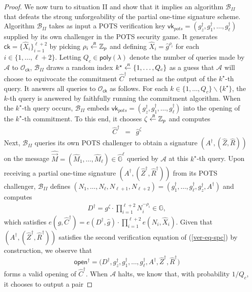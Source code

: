 \documentclass[10pt]{llncs}
\newcommand{\A}{\mathcal{A}}
\newcommand{\B}{\mathcal{B}}
\newcommand{\G}{\mathbb{G}}
\newcommand{\Z}{\mathbb{Z}}
\newcommand{\ck}{\mathsf{ck}}
\newcommand{\vk}{\mathsf{vk}}
\newcommand{\open}{\mathsf{open}}
\newcommand{\sample}{\stackrel{{\scriptscriptstyle \mkern4mu R}}{\gets}}
\begin{document}
\begin{proof}
We now turn to situation II and show that it implies an algorithm $\B_{II}$ that defeats  the strong unforgeability of the partial one-time signature scheme. Algorithm $\B_{II}$ takes as input a POTS verification key $\vk_{pots}=(g_z^\dagger,g_1^\dagger,\ldots,g_{\ell}^\dagger)$ supplied by its own challenger 
in the POTS security game. It generates $\ck = \{ \hat{X}_i \}_{i=1}^{\ell+2}$ by picking $\rho_i \sample \Z_p$ and 
defining $\hat{X}_i=\hat{g}^{\rho_i}$  for each $i \in \{1,\ldots, \ell+2\}$. Letting $Q_c \in \mathsf{poly}(\lambda)$ denote the number of 
queries made by $\A$ to $\mathcal{O}_{\ck}$, $\B_{II}$ draws a random 
index $k^\star \sample \{1,\ldots, Q_c \}$ as a guess that $\A$ will choose to equivocate the commitment $\hat{C}^\dagger$ returned as the 
output of the $k^\star$-th query. It answers all queries to $\mathcal{O}_\ck$ as follows. For each $k \in \{1,\ldots ,Q_c \} \backslash 
\{k^\star \}$, the $k$-th query is answered by faithfully running the commitment algorithm. When the $k^\star$-th query occurs, 
$\B_{II}$ embeds $\vk_{pots}=(g_z^\dagger,g_1^\dagger,\ldots,g_{\ell}^\dagger)$ into the opening of the $k^\star$-th commitment. To this end, it chooses 
 $\zeta \sample \Z_p$ and 
computes 
\begin{eqnarray*}
\hat{C}^\dagger &=& \hat{g}^{\zeta} 
\end{eqnarray*}
Next, $\B_{II}$ queries its own POTS challenger to obtain a signature $(A^\dagger,(\hat{Z},\hat{R}))$ on  the message 
$\hat{\vec{M}}=(\hat{M}_1,\ldots,\hat{M}_{\ell})
 \in \hat{\G}^{\ell}$ queried by $\A$ at this $k^\star$-th query. Upon receiving a partial one-time signature 
$(A^\dagger,(\hat{Z}^\dagger,\hat{R}^\dagger))$ from its POTS challenger, $\B_{II}$ defines
 $(N_1,\ldots,N_{\ell},N_{\ell+1},N_{\ell+2})=(g_1^\dagger,\ldots, g_{\ell}^\dagger ,g_z^\dagger , A^\dagger)$ 
and computes 
\begin{eqnarray*}
 D^\dagger = g^\zeta \cdot \prod_{i=1}^{\ell+2} N_i^{-\rho_i} \in \G,
\end{eqnarray*}
which satisfies $e(g,\hat{C}^\dagger) = e(D^\dagger,\hat{g}) \cdot \prod_{i=1}^{\ell+2} e(N_i,\hat{X}_i) $.  Given that $(A^\dagger,(\hat{Z}^\dagger,\hat{R}^\dagger))$ satisfies 
the second verification equation of (\ref{ver-eq-spc}) by construction, we observe that
$$ \open^\dagger =   \big( D^\dagger, g_z^\dagger , g_1^\dagger, \ldots, g_\ell^\dagger , A^\dagger , \hat{Z}^\dagger , \hat{R}^\dagger \big) $$
forms a valid opening of $\hat{C}^\dagger$. When $\A$ halts, we know that, with probability $1/Q_c$, it chooses to output  a pair 

\end{proof}
\end{document}
